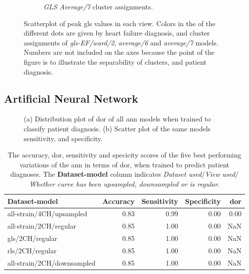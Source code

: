 \begin{figure}[H]
\begin{subfigure}[b]{0.49\textwidth}
        \caption{\textit{GLS Average/7} cluster assignments.}
        \label{fig:scatter_gls_average7}
    \end{subfigure}
    \caption{Scatterplot of peak \acrshort{gls} values in each view. Colors in the of the different dots are given by heart failure diagnosis, and cluster assignments of 
             \textit{gls-EF/ward/2}, \textit{average/6} and \textit{average/7} models. Numbers are not included on the axes because the point of the figure is to illustrate the separability 
             of clusters, and patient diagnosis.}
             \label{fig:scatter_gls_ind_cluster_assignments}
\end{figure}

\newpage

\subsection{Artificial Neural Network}

\begin{figure}[H]
    \centering
    
    \caption{(a) Distribution plot of \acrshort{dor} of all \acrshort{ann} models when trained to classify patient diagnosis.
             (b) Scatter plot of the same models sensitivity, and specificity.}
    \label{fig:dl_ind_dor_sens_spec_dist}
\end{figure}

\begin{table}
    \centering
    \begin{tabular}{lrrrr}
        \toprule
        Dataset-model              &  Accuracy &  Sensitivity &  Specificity &  \acrshort{dor} \\
        \midrule
        all-strain/4CH/upsampled   &      0.83 &         0.99 &         0.00 & 0.00 \\
        all-strain/2CH/regular     &      0.85 &         1.00 &         0.00 &  NaN \\
        gls/2CH/regular            &      0.85 &         1.00 &         0.00 &  NaN \\
        rls/2CH/regular            &      0.85 &         1.00 &         0.00 &  NaN \\
        all-strain/2CH/downsampled &      0.85 &         1.00 &         0.00 &  NaN \\
        \bottomrule
    \end{tabular}
    \caption{The accuracy, \acrshort{dor}, sensitivity and specicity scores of the five best performing variations of the \acrshort{ann} in terms of \acrshort{dor}, when trained to predict patient diagnoses.
             The \textbf{Dataset-model} column indicates \textit{Dataset used}$/$\textit{View used}$/$\textit{Whether curve has been upsampled, downsampled or is regular}.}
    \label{tab:dl_ind_dor_sens_spec_dist}
\end{table}

